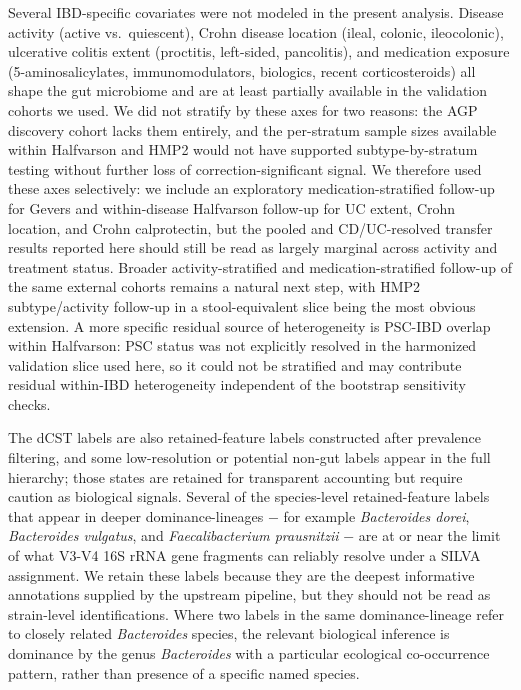 \documentclass[
  11pt,
]{article}
\newcommand{\taxon}[1]{\emph{#1}}
\begin{document}
Several IBD-specific covariates were not modeled in the present
analysis. Disease activity (active vs.~quiescent), Crohn disease
location (ileal, colonic, ileocolonic), ulcerative colitis extent
(proctitis, left-sided, pancolitis), and medication exposure
(5-aminosalicylates, immunomodulators, biologics, recent
corticosteroids) all shape the gut microbiome and are at least
partially available in the validation cohorts we used. We did not
stratify by these axes for two reasons: the AGP discovery cohort lacks
them entirely, and the per-stratum sample sizes available within
Halfvarson and HMP2 would not have supported subtype-by-stratum testing
without further loss of correction-significant signal. We therefore
used these axes selectively: we include an exploratory
medication-stratified follow-up for Gevers and within-disease
Halfvarson follow-up for UC extent, Crohn location, and Crohn
calprotectin, but the pooled and CD/UC-resolved transfer results
reported here should still be read as largely marginal across activity
and treatment status. Broader activity-stratified and
medication-stratified follow-up of the same external cohorts remains a
natural next step, with HMP2 subtype/activity follow-up in a
stool-equivalent slice being the most obvious extension. A more
specific residual source of heterogeneity is
PSC-IBD overlap within Halfvarson: PSC status was not explicitly
resolved in the harmonized validation slice used here, so it could not
be stratified and may contribute residual within-IBD heterogeneity
independent of the bootstrap sensitivity checks.

The dCST labels are also retained-feature labels constructed after
prevalence filtering, and some low-resolution or potential non-gut
labels appear in the full hierarchy; those states are retained for
transparent accounting but require caution as biological signals.
Several of the species-level retained-feature labels that appear in
deeper dominance-lineages \(-\) for example \taxon{Bacteroides dorei},
\taxon{Bacteroides vulgatus}, and \taxon{Faecalibacterium prausnitzii}
\(-\) are at or near the limit of what V3-V4 16S rRNA gene fragments
can reliably resolve under a SILVA assignment. We retain these labels
because they are the deepest informative annotations supplied by the
upstream pipeline, but they should not be read as strain-level
identifications. Where two labels in the same dominance-lineage refer
to closely related \taxon{Bacteroides} species, the relevant biological
inference is dominance by the genus \taxon{Bacteroides} with a
particular ecological co-occurrence pattern, rather than presence of a
specific named species.
\end{document}
